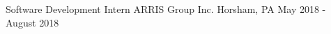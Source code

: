 

\begin{cventries}

  \cventrywork
    {Software Development Intern} %
    {ARRIS Group Inc.} %
    {Horsham, PA} %
    {May 2018 - August 2018} %
    
  \vspace{-5mm}

\end{cventries}
